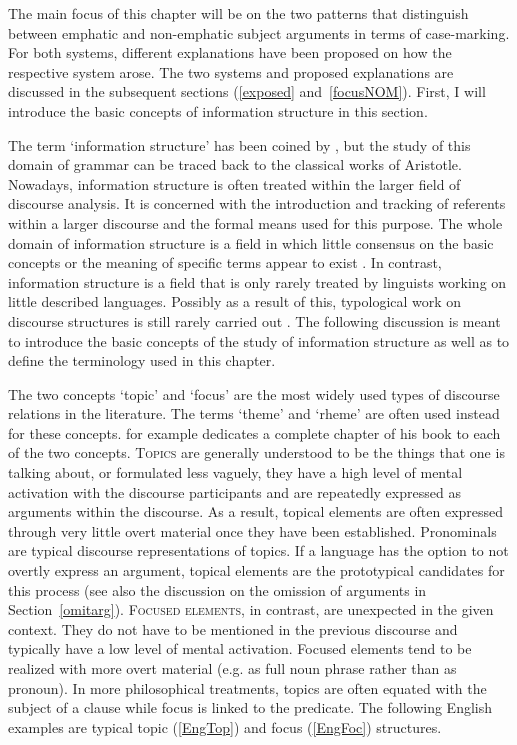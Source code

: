 The main focus of this chapter will be on the two patterns that distinguish between emphatic and non-emphatic subject arguments in terms of case-marking. 
For both systems, different explanations have been proposed on how the respective system arose. 
The two systems and proposed explanations are discussed in the subsequent sections (\ref{exposed} and~\ref{focusNOM}). 
First, I will introduce the basic concepts of information structure in this section. 

The term `information structure' has been coined by \citet{Halliday:1967}, but the study of this domain of grammar can be traced back to the classical works of Aristotle. 
Nowadays, information structure is often treated within the larger field of discourse analysis. 
It is concerned with the introduction and tracking of referents within a larger discourse and the formal means used for this purpose. 
The whole domain of information structure is a field in which little consensus on the basic concepts or the meaning of specific terms appear to exist \citep[261--276]{Payne:1997}. %
In contrast, information structure is a field that is only rarely treated by linguists working on little described languages.
Possibly as a result of this, typological work on discourse structures is still rarely carried out \citep{Myhill:2001}.   
The following discussion is meant to introduce the basic concepts of the study of information structure as well as to define the terminology used in this chapter.

The two concepts `topic' and `focus' are the most widely used types of discourse relations in the literature. 
The terms `theme' and `rheme' are often used instead for these concepts.
\citet{Lambrecht:1994} for example dedicates a complete chapter of his book to each of the two concepts. 
\textsc{Topics} are generally understood to be the things that one is talking about, or formulated less vaguely, they have a high level of mental activation with the discourse participants and are repeatedly expressed as arguments within the discourse. 
As a result, topical elements are often expressed through very little overt material once they have been established. 
Pronominals are typical discourse representations of topics. 
If a language has the option to not overtly express an argument, topical elements are the prototypical candidates for this process (see also the discussion on the omission of arguments in Section~\ref{omitarg}). 
\textsc{Focused elements}, in contrast, are unexpected in the given context. 
They do not have to be mentioned in the previous discourse and typically have a low level of mental activation. 
Focused elements tend to be realized with more overt material (e.g. as full noun phrase rather than as pronoun). 
In more philosophical treatments, topics are often equated with the subject of a clause while focus is linked to the predicate.
The following English examples are typical topic (\ref{EngTop}) and focus (\ref{EngFoc}) structures.

